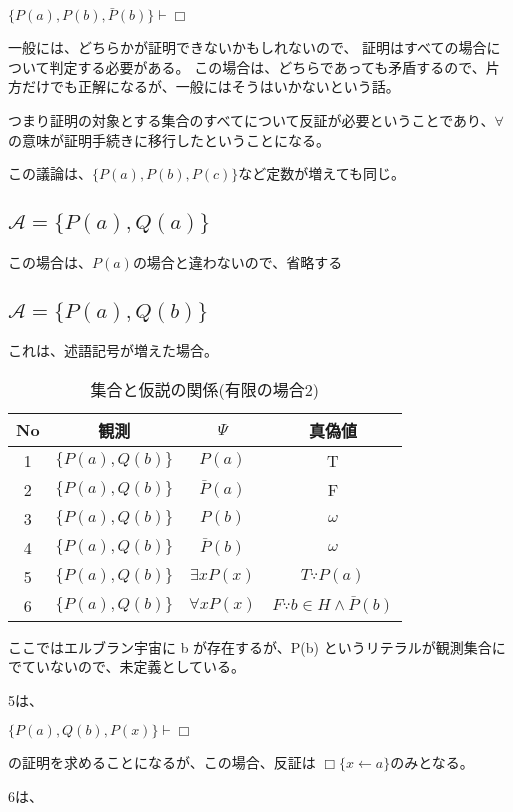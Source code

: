 \documentclass[10pt, oneside]{jarticle}   	%
\theoremstyle{definition}
\newcommand{\undet}{\omega}
\newcommand{\cont}{\Box}
\newcommand{\eset}[1]{\{{#1}\}}
\begin{document}
$\{P(a), P(b), \bar P(b)\} \vdash \cont$

一般には、どちらかが証明できないかもしれないので、
証明はすべての場合について判定する必要がある。
この場合は、どちらであっても矛盾するので、片方だけでも正解になるが、一般にはそうはいかないという話。


つまり証明の対象とする集合のすべてについて反証が必要ということであり、$\forall$の意味が証明手続きに移行したということになる。

この議論は、$\eset{P(a), P(b), P(c)}$など定数が増えても同じ。
\subsection{$\mathcal{A}=\{P(a), Q(a)\}$}
この場合は、$P(a)$の場合と違わないので、省略する

\subsection{$\mathcal{A}=\eset{P(a), Q(b)}$}
これは、述語記号が増えた場合。

\begin{table}[htbp]
 \centering
 \begin{tabular}{|c|c|c|c|}\hline
   No & 観測 & $\Psi$ & 真偽値 \\ \hline
   1 & $\eset{P(a), Q(b)}$ & $P(a)$ & T \\ \hline
   2 & $\eset{P(a), Q(b)}$ & $\bar P(a)$ & F \\ \hline
   3 & $\eset{P(a), Q(b)}$ & $P(b)$ & $\undet$ \\ \hline
   4 & $\eset{P(a), Q(b)}$ & $\bar P(b)$ & $\undet$ \\ \hline
   5 & $\eset{P(a), Q(b)}$& $\exists x P(x)$ & $T \because P(a)$ \\ \hline
   6 & $\eset{P(a), Q(b)}$ & $\forall x P(x)$ & $F \because b \in H \land \bar P(b)$ \\ \hline
 \end{tabular}
 \caption{集合と仮説の関係(有限の場合2)}
 \label{tab:ex0103}
\end{table}

ここではエルブラン宇宙に b が存在するが、P(b) というリテラルが観測集合にでていないので、未定義としている。

5は、

$\eset{P(a), Q(b), P(x)} \vdash \cont$ 

の証明を求めることになるが、この場合、反証は $\cont\{x \leftarrow a\}$のみとなる。

6は、
\end{document}
